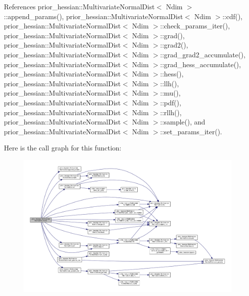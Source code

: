 References prior\+\_\+hessian\+::\+Multivariate\+Normal\+Dist$<$ Ndim $>$\+::append\+\_\+params(), prior\+\_\+hessian\+::\+Multivariate\+Normal\+Dist$<$ Ndim $>$\+::cdf(), prior\+\_\+hessian\+::\+Multivariate\+Normal\+Dist$<$ Ndim $>$\+::check\+\_\+params\+\_\+iter(), prior\+\_\+hessian\+::\+Multivariate\+Normal\+Dist$<$ Ndim $>$\+::grad(), prior\+\_\+hessian\+::\+Multivariate\+Normal\+Dist$<$ Ndim $>$\+::grad2(), prior\+\_\+hessian\+::\+Multivariate\+Normal\+Dist$<$ Ndim $>$\+::grad\+\_\+grad2\+\_\+accumulate(), prior\+\_\+hessian\+::\+Multivariate\+Normal\+Dist$<$ Ndim $>$\+::grad\+\_\+hess\+\_\+accumulate(), prior\+\_\+hessian\+::\+Multivariate\+Normal\+Dist$<$ Ndim $>$\+::hess(), prior\+\_\+hessian\+::\+Multivariate\+Normal\+Dist$<$ Ndim $>$\+::llh(), prior\+\_\+hessian\+::\+Multivariate\+Normal\+Dist$<$ Ndim $>$\+::mu(), prior\+\_\+hessian\+::\+Multivariate\+Normal\+Dist$<$ Ndim $>$\+::pdf(), prior\+\_\+hessian\+::\+Multivariate\+Normal\+Dist$<$ Ndim $>$\+::rllh(), prior\+\_\+hessian\+::\+Multivariate\+Normal\+Dist$<$ Ndim $>$\+::sample(), and prior\+\_\+hessian\+::\+Multivariate\+Normal\+Dist$<$ Ndim $>$\+::set\+\_\+params\+\_\+iter().



Here is the call graph for this function\+:\nopagebreak
\begin{figure}[H]
\begin{center}
\leavevmode
\includegraphics[width=350pt]{classprior__hessian_1_1MultivariateNormalDist_afdec8e6a453a2c69e0d84833d6b3e5ae_cgraph}
\end{center}
\end{figure}



